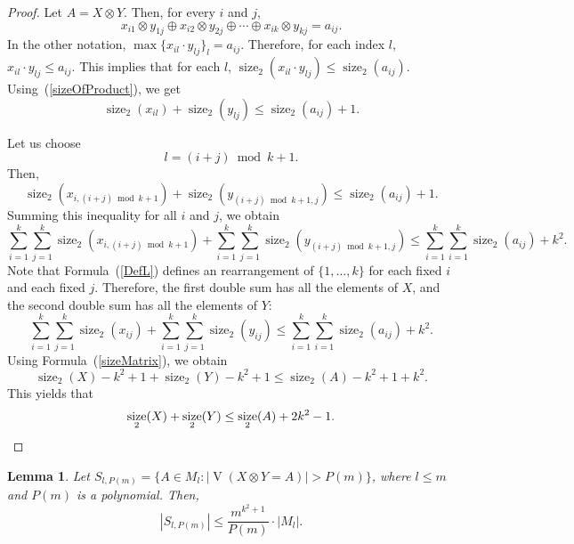 \documentclass[reqno,12pt]{amsart}
\newtheorem{lemma}{Lemma}
\theoremstyle{definition}
\DeclareMathOperator{\size}{size}
\DeclareMathOperator{\V}{\mathrm{V}}
\begin{document}
\begin{proof}
Let $A = X \otimes Y$. Then, for every $i$ and $j$,
$$
x_{i1} \otimes y_{1j} \oplus x_{i2} \otimes y_{2j} \oplus \cdots \oplus x_{ik} \otimes y_{kj} = a_{ij}.
$$
In the other notation, 
$\max\{x_{il} \cdot y_{lj}\}_{l} = a_{ij}.$
Therefore, for each index $l$, $x_{il} \cdot y_{lj} \leq a_{ij}.$
This implies that for each $l$,
$\size_2(x_{il} \cdot y_{lj}) \leq \size_2(a_{ij})$.
Using~(\ref{sizeOfProduct}), we get 
$$
\size_2(x_{il}) + \size_2(y_{lj}) \leq \size_2(a_{ij}) + 1.
$$

Let us choose 
\begin{equation}\label{DefL}
l = (i + j) \bmod k + 1.
\end{equation}
Then,
$$
\size_2(x_{i, (i + j) \bmod k + 1}) + \size_2(y_{(i + j) \bmod k + 1, j}) \leq \size_2(a_{ij}) + 1.
$$
Summing this inequality for all $i$ and $j$, we obtain
$$
\sum_{i = 1}^k\sum_{j = 1}^k\size_2(x_{i, (i + j) \bmod k + 1}) + \sum_{i = 1}^k\sum_{j = 1}^k\size_2(y_{(i + j) \bmod k + 1, j}) \leq \sum_{i = 1}^k\sum_{i = 1}^k\size_2(a_{ij}) + k^2.
$$
Note that Formula~(\ref{DefL}) defines an rearrangement of $\{1, \ldots, k\}$ for each fixed $i$ and each fixed $j$. Therefore, the first double sum has all the elements of $X$,
and the second double sum has all the elements of $Y$:
$$
\sum_{i = 1}^k\sum_{j = 1}^k\size_2(x_{ij}) + \sum_{i = 1}^k\sum_{j = 1}^k\size_2(y_{ij}) \leq \sum_{i = 1}^k\sum_{i = 1}^k\size_2(a_{ij}) + k^2.
$$
Using Formula~(\ref{sizeMatrix}), we obtain
$$
\size_2(X) - k^2 + 1 + \size_2(Y) - k^2 + 1 \leq \size_2(A) - k^2 + 1 + k^2.
$$
This yields that 
\[
\size_2(X) + \size_2(Y)\leq \size_2(A) + 2k^2 - 1.
\qedhere
\]
\end{proof}

\begin{lemma}\label{Lemma100}
Let $S_{l, P(m)} = \{A \in M_l : |\!\V(X \otimes Y = A)| > P(m)\}$,
where $l \leq m$ and $P(m)$ is a polynomial. Then,
\begin{equation}
\label{FormulaLemmaGen14}
|S_{l, P(m)}| \leq \frac{m^{k^2 + 1}}{P(m)}
\cdot|M_l|.
\end{equation}
\end{lemma}
\end{document}
